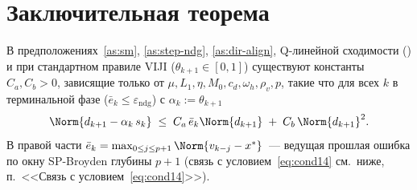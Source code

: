 \section{Заключительная теорема}
\label{sec:app-aln-l1:close}

\begin{theorem}
\label{thm:app-aln-l1:main}
В предположениях~\ref{as:sm}, \ref{as:step-ndg}, \ref{as:dir-align},
Q-линейной сходимости \textup{(}\cite[Theorem~3.4]{Agafonov2024VIJI}\textup{)}
и при стандартном правиле VIJI ($\theta_{k+1}\in[0,1]$) существуют
константы $C_a, C_b > 0$, зависящие только от
$\mu, L_1, \eta, M_0, c_d, \omega_h, \rho_v, p$, такие что для всех $k$
в терминальной фазе \textup{(}$\bar e_k \le
\varepsilon_{\mathrm{ndg}}$\textup{)} с $\alpha_k := \theta_{k+1}$
\begin{equation}
\Norm{d_{k+1} - \alpha_k\,s_k}
\;\le\; C_a\,\bar e_k\Norm{d_{k+1}}
\;+\; C_b\,\Norm{d_{k+1}}^{2}.
\label{eq:app-aln-l1:final}
\end{equation}
В правой части $\bar e_k = \max_{0\le j\le p+1}\Norm{v_{k-j}-x^{*}}$~---
ведущая прошлая ошибка по окну SP-Broyden глубины $p+1$
\textup{(}связь с условием~\eqref{eq:cond14} см.~ниже,
п.~<<Связь с условием~\eqref{eq:cond14}>>\textup{)}.
\end{theorem}

